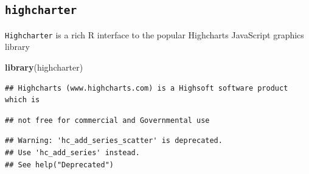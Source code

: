 \documentclass[]{book}
\newenvironment{Shaded}{\begin{snugshade}}{\end{snugshade}}
\newcommand{\KeywordTok}[1]{\textcolor[rgb]{0.13,0.29,0.53}{\textbf{{#1}}}}
\newcommand{\DataTypeTok}[1]{\textcolor[rgb]{0.13,0.29,0.53}{{#1}}}
\newcommand{\DecValTok}[1]{\textcolor[rgb]{0.00,0.00,0.81}{{#1}}}
\newcommand{\StringTok}[1]{\textcolor[rgb]{0.31,0.60,0.02}{{#1}}}
\newcommand{\NormalTok}[1]{{#1}}
\theoremstyle{definition}
\theoremstyle{definition}
\theoremstyle{remark}
\begin{document}
\hypertarget{htmlwidget-643310ced3bf9d7d9ff9}{}

\subsection{\texorpdfstring{\texttt{highcharter}}{highcharter}}\label{highcharter}

\texttt{Highcharter} is a rich R interface to the popular Highcharts
JavaScript graphics library

\begin{Shaded}
\begin{Highlighting}[]
\KeywordTok{library}\NormalTok{(highcharter)}
\end{Highlighting}
\end{Shaded}

\begin{verbatim}
## Highcharts (www.highcharts.com) is a Highsoft software product which is
\end{verbatim}

\begin{verbatim}
## not free for commercial and Governmental use
\end{verbatim}

\begin{Shaded}
\end{Shaded}

\begin{verbatim}
## Warning: 'hc_add_series_scatter' is deprecated.
## Use 'hc_add_series' instead.
## See help("Deprecated")
\end{verbatim}
\end{document}
